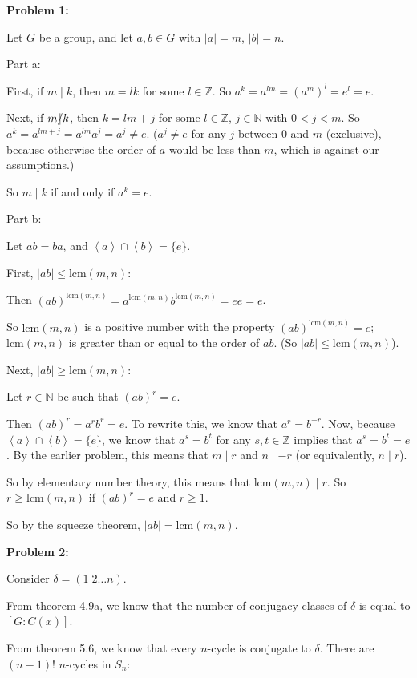 \documentclass[a4paper,12pt]{article}
\newcommand{\tab}{\hspace{4mm}} %
\newcommand{\shunt}{\vspace{20mm}}
\newcommand{\absval}[1]{\lvert #1 \rvert}
\newcommand{\anbrack}[1]{\left\langle #1 \right\rangle}
\newcommand{\de}{\delta}
\newcommand{\N}{\mathbb{N}}
\newcommand{\Z}{\mathbb{Z}}
\begin{document}
{\bf Problem 1:}

Let $G$ be a group, and let $a, b \in G$ with $\absval{a} = m$, $\absval{b} = n$.

Part a:

First, if $m \mid k$, then $m = lk$ for some $l \in \Z$. So $a^k = a^{lm} = (a^{m})^l = e^l = e$.

Next, if $m \slashed{\mid} k$, then $k = lm + j$ for some $l \in \Z$, $j \in \N$ with $0 < j < m$. So $a^k = a^{lm+j} = a^{lm}a^j=a^j \neq e$. ($a^j \neq e$ for any $j$ between $0$ and $m$ (exclusive), because otherwise the order of $a$ would be less than $m$, which is against our assumptions.)

So $m \mid k$ if and only if $a^k = e$.

\shunt

Part b:

Let $ab=ba$, and $\anbrack{a} \cap \anbrack{b} = \{e\}$.

First, $\absval{ab} \leq \text{lcm}(m,n)$:

\tab Then $(ab)^{\text{lcm}(m,n)} = a^{\text{lcm}(m,n)}b^{\text{lcm}(m,n)} = ee=e$.

\tab So ${\text{lcm}(m,n)}$ is a positive number with the property $(ab)^{\text{lcm}(m,n)} =e$; $\text{lcm}(m,n)$ is greater than or equal to the order of $ab$. (So $\absval{ab} \leq \text{lcm}(m,n)$).

Next, $\absval{ab} \geq \text{lcm}(m,n)$:

\tab Let $r \in \N$ be such that $(ab)^r = e$.

\tab Then $(ab)^r = a^rb^r = e$. To rewrite this, we know that $a^r = b^{-r}$. Now, because $\anbrack{a} \cap \anbrack{b} = \{e\}$, we know that $a^s = b^t$ for any $s, t \in \Z$ implies that $a^s = b^t = e$. By the earlier problem, this means that $m \mid r$ and $n \mid -r$ (or equivalently, $n \mid r$).

\tab So by elementary number theory, this means that $\text{lcm}(m,n) \mid r$. So $r \geq \text{lcm}(m,n)$ if $(ab)^r = e$ and $r \geq 1$.

So by the squeeze theorem, $\absval{ab} = \text{lcm}(m,n)$.

\shunt

{\bf Problem 2:}

Consider $\de = (1 \; 2 \ldots n)$.

From theorem 4.9a, we know that the number of conjugacy classes of $\de$ is equal to $[G:C(x)]$.

From theorem 5.6, we know that every $n$-cycle is conjugate to $\de$. There are $(n-1)!$ $n$-cycles in $S_n$:
\end{document}
